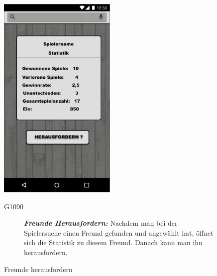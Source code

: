\documentclass[parskip=full]{scrartcl}
\begin{document}
	\begin{figure}[htp]
		\begin{minipage}[t]{6cm}
			\vspace{0pt}
			\includegraphics[height=100mm]{spielerprofil.png}
			\caption{Freunde herausfordern}
			\label{fig:Freunde herausforern}
		\end{minipage}
		\hfill
		\begin{minipage}[t]{6cm}
			\vspace{0pt}
			\begin{description}
				\item[G1090] \textbf{\textit{Freunde Herausfordern: }} Nachdem man bei der Spielersuche einen Freund gefunden und angewählt hat, öffnet sich die Statistik zu diesem Freund. Danach kann man ihn herausfordern.
			\end{description}
		\end{minipage}
		

\end{figure}
\end{document}
